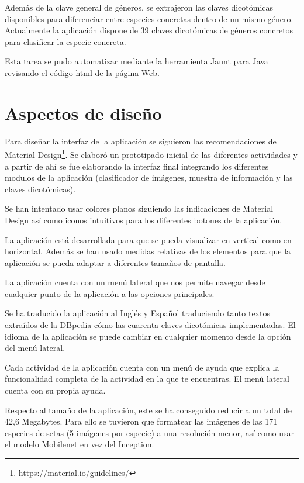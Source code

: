 Además de la clave general de géneros, se extrajeron las claves dicotómicas disponibles para diferenciar entre especies concretas dentro de un mismo género. Actualmente la aplicación dispone de 39 claves dicotómicas de géneros concretos para clasificar la especie concreta.

Esta tarea se pudo automatizar mediante la herramienta Jaunt para Java revisando el código html de la página Web.

\section{Aspectos de diseño}

Para diseñar la interfaz de la aplicación se siguieron las recomendaciones de Material Design\footnote{\url{https://material.io/guidelines/}}. Se elaboró un prototipado inicial de las diferentes actividades y a partir de ahí se fue elaborando la interfaz final integrando los diferentes modulos de la aplicación (clasificador de imágenes, muestra de información y las claves dicotómicas).

Se han intentado usar colores planos siguiendo las indicaciones de Material Design así como iconos intuitivos para los diferentes botones de la aplicación.

La aplicación está desarrollada para que se pueda visualizar en vertical como en horizontal. Además se han usado medidas relativas de los elementos para que la aplicación se pueda adaptar a diferentes tamaños de pantalla.

La aplicación cuenta con un menú lateral que nos permite navegar desde cualquier punto de la aplicación a las opciones principales.

Se ha traducido la aplicación al Inglés y Español traduciendo tanto textos extraídos de la DBpedia cómo las cuarenta claves dicotómicas implementadas. El idioma de la aplicación se puede cambiar en cualquier momento desde la opción del menú lateral.

Cada actividad de la aplicación cuenta con un menú de ayuda que explica la funcionalidad completa de la actividad en la que te encuentras. El menú lateral cuenta con su propia ayuda.

Respecto al tamaño de la aplicación, este se ha conseguido reducir a un total de 42,6 Megabytes. Para ello se tuvieron que formatear las imágenes de las 171 especies de setas (5 imágenes por especie) a una resolución menor, así como usar el modelo Mobilenet en vez del Inception.









